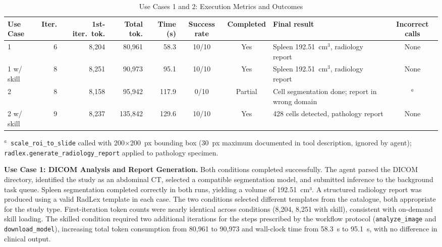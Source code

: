 \documentclass[conference]{IEEEtran}
\begin{document}
\begin{table}[t]
  \caption{Use Cases 1 and 2: Execution Metrics and Outcomes}
  \label{tab:uc1-results}
  \centering
  \small
  \begin{tabular}{lrrrrccp{4cm}c}
    \toprule
    Use Case & Iter. & 1st-iter.\ tok. & Total tok. & Time (s) & Success rate & Completed & Final result & Incorrect calls \\
    \midrule
    1               & 6 & 8{,}204  & 80{,}961  & 58.3  & 10/10 & Yes     & Spleen 192.51~cm$^{3}$, radiology report       & None \\
    1 w/ skill      & 8 & 8{,}251  & 90{,}973  & 95.1  & 10/10 & Yes     & Spleen 192.51~cm$^{3}$, radiology report       & None \\
    2               & 8 & 8{,}158  & 95{,}942  & 117.9 & 0/10  & Partial & Cell segmentation done; report in wrong domain & $^{a}$ \\
    2 w/ skill      & 9 & 8{,}237  & 135{,}842 & 129.6 & 10/10 & Yes     & 428 cells detected, pathology report           & None \\
    \bottomrule
  \end{tabular}
  \par\smallskip
  \raggedright\footnotesize
  $^{a}$~\texttt{scale\_roi\_to\_slide} called with 200$\times$200~px bounding box (30~px maximum documented in tool description, ignored by agent); \texttt{radlex.generate\_radiology\_report} applied to pathology specimen.
\end{table}

\textbf{Use Case 1: DICOM Analysis and Report Generation.}
Both conditions completed successfully. The agent parsed the DICOM directory, identified the study as an abdominal CT, selected a compatible segmentation model, and submitted inference to the background task queue. Spleen segmentation completed correctly in both runs, yielding a volume of 192.51~cm³. A structured radiology report was produced using a valid RadLex template in each case. The two conditions selected different templates from the catalogue, both appropriate for the study type. First-iteration token counts were nearly identical across conditions (8,204, 8,251 with skill), consistent with on-demand skill loading. The skilled condition required two additional iterations for the steps prescribed by the workflow protocol (\texttt{analyze\_image} and \texttt{download\_model}), increasing total token consumption from 80,961 to 90,973 and wall-clock time from 58.3~s to 95.1~s, with no difference in clinical output.
\end{document}
